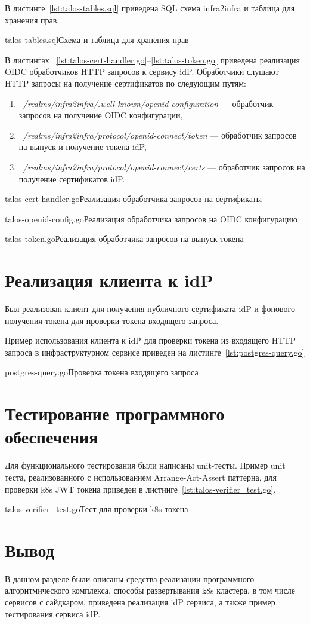 В листинге~\ref{lst:talos-tables.sql} приведена SQL схема infra2infra и таблица для хранения прав.

	{talos-tables.sql}{Схема и таблица для хранения прав}
	
В листингах ~\ref{lst:talos-cert-handler.go}--\ref{lst:talos-token.go} приведена реализация OIDC обработчиков HTTP запросов к сервису idP.
Обработчики слушают HTTP запросы на получение сертификатов по следующим путям:
\begin{enumerate}
\item ~\textit{/realms/infra2infra/.well-known/openid-configuration} --- обработчик запросов на получение OIDC конфигурации,
\item ~\textit{/realms/infra2infra/protocol/openid-connect/token} --- обработчик запросов на выпуск и получение токена idP,
\item ~\textit{/realms/infra2infra/protocol/openid-connect/certs} --- обработчик запросов на получение сертификатов idP.
\end{enumerate}

	{talos-cert-handler.go}{Реализация обработчика запросов на сертификаты}
	
	{talos-openid-config.go}{Реализация обработчика запросов на OIDC конфигурацию}	

	{talos-token.go}{Реализация обработчика запросов на выпуск токена}
	
\section{Реализация клиента к idP}
Был реализован клиент для получения публичного сертификата idP и фонового получения токена для проверки токена входящего запроса.

Пример использования клиента к idP для проверки токена из входящего HTTP запроса в инфраструктурном сервисе приведен на листинге~\ref{lst:postgres-query.go}

	{postgres-query.go}{Проверка токена входящего запроса}
	
\section{Тестирование программного обеспечения}

Для функционального тестирования были написаны unit-тесты.
Пример unit теста, реализованного с использованием Arrange-Act-Assert паттерна, для проверки k8s JWT токена приведен в листинге~\ref{lst:talos-verifier_test.go}.

	{talos-verifier_test.go}{Тест для проверки k8s токена}
	
\section*{Вывод}
В данном разделе были описаны средства реализации программного-алгоритмического комплекса, способы развертывания k8s кластера, в том числе сервисов с сайдкаром, приведена реализация idP сервиса, а также пример тестирования сервиса idP.
